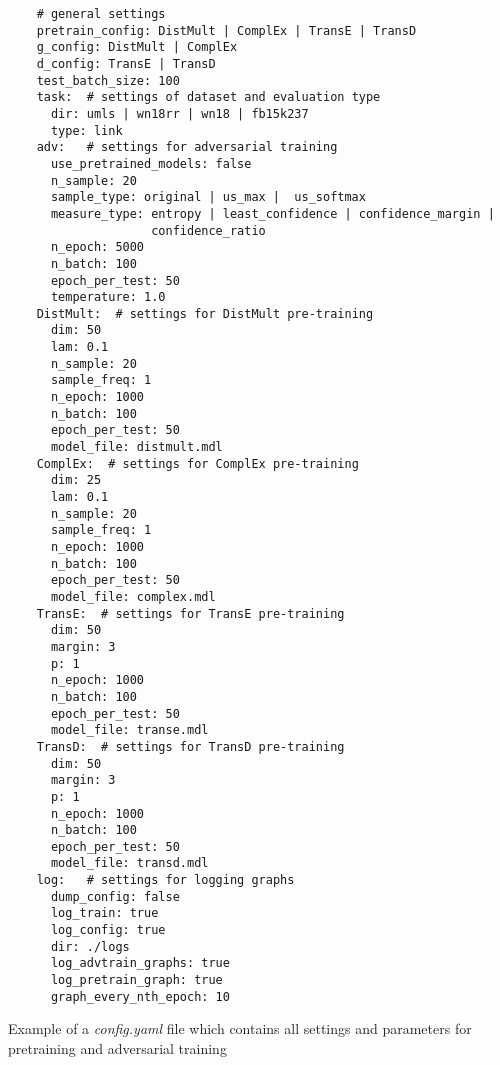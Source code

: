 \begin{longlisting}
  \begin{verbatim}
    # general settings
    pretrain_config: DistMult | ComplEx | TransE | TransD
    g_config: DistMult | ComplEx
    d_config: TransE | TransD
    test_batch_size: 100 
    task:  # settings of dataset and evaluation type
      dir: umls | wn18rr | wn18 | fb15k237
      type: link
    adv:   # settings for adversarial training
      use_pretrained_models: false
      n_sample: 20 
      sample_type: original | us_max |  us_softmax
      measure_type: entropy | least_confidence | confidence_margin | 
                    confidence_ratio  
      n_epoch: 5000
      n_batch: 100 
      epoch_per_test: 50
      temperature: 1.0
    DistMult:  # settings for DistMult pre-training
      dim: 50
      lam: 0.1
      n_sample: 20
      sample_freq: 1
      n_epoch: 1000
      n_batch: 100
      epoch_per_test: 50
      model_file: distmult.mdl
    ComplEx:  # settings for ComplEx pre-training
      dim: 25
      lam: 0.1
      n_sample: 20
      sample_freq: 1
      n_epoch: 1000 
      n_batch: 100 
      epoch_per_test: 50
      model_file: complex.mdl
    TransE:  # settings for TransE pre-training
      dim: 50
      margin: 3
      p: 1
      n_epoch: 1000 
      n_batch: 100 
      epoch_per_test: 50
      model_file: transe.mdl
    TransD:  # settings for TransD pre-training
      dim: 50
      margin: 3
      p: 1
      n_epoch: 1000 
      n_batch: 100
      epoch_per_test: 50
      model_file: transd.mdl
    log:   # settings for logging graphs
      dump_config: false
      log_train: true
      log_config: true
      dir: ./logs
      log_advtrain_graphs: true
      log_pretrain_graph: true
      graph_every_nth_epoch: 10
\end{verbatim}
  \caption{Example of a \textit{config.yaml} file which contains all settings and parameters for pretraining and adversarial training}
  \label{lst:config_yaml}
\end{longlisting}